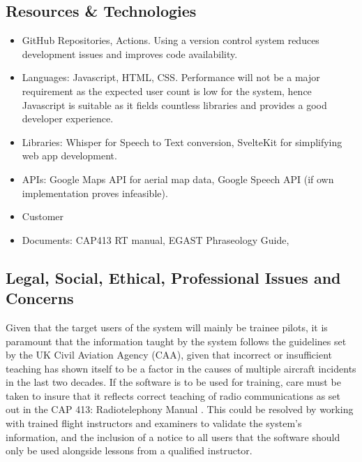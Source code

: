 \subsection{Resources \& Technologies}
\begin{itemize}
    \item GitHub Repositories, Actions. Using a version control system reduces development issues and improves code availability.
    \item Languages: Javascript, HTML, CSS. Performance will not be a major requirement as the expected user count is low for the system, hence Javascript is suitable as it fields countless libraries and provides a good developer experience.
    \item Libraries: Whisper for Speech to Text conversion, SvelteKit for simplifying web app development.
    \item APIs: Google Maps API for aerial map data, Google Speech API (if own implementation proves infeasible).
    \item Customer
    \item Documents: CAP413 RT manual, EGAST Phraseology Guide, 
\end{itemize}

\subsection{Legal, Social, Ethical, Professional Issues and Concerns}
Given that the target users of the system will mainly be trainee pilots, it is paramount that the information taught by the system follows the guidelines set by the UK Civil Aviation Agency (CAA), given that incorrect or insufficient teaching has shown itself to be a factor in the causes of multiple aircraft incidents in the last two decades. If the software is to be used for training, care must be taken to insure that it reflects correct teaching of radio communications as set out in the CAP 413: Radiotelephony Manual \cite{CAP413}. This could be resolved by working with trained flight instructors and examiners to validate the system's information, and the inclusion of a notice to all users that the software should only be used alongside lessons from a qualified instructor.